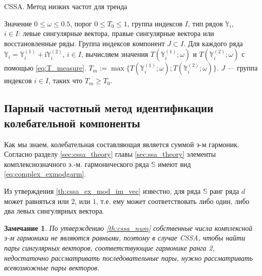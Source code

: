\documentclass[specialist,
               substylefile = spbu.rtx,
               subf,href,colorlinks=true, 12pt]{disser}
\newcommand{\I}{\mathrm{i}}
\newtheorem{remark}{Замечание}
\begin{document}
\begin{algorithm}[!hhh]
\caption{CSSA. Метод низких частот для тренда}
\label{alg:freqcssa}
\begin{algorithmic}[1]
\REQUIRE Значение  $0 \leqslant  \omega \leqslant 0.5$, порог $0 \leqslant T_0 \leqslant 1$, группа индексов $I$, тип рядов $\mathbb{Y}_i$,\\ $i \in I$: левые сингулярные вектора,
правые сингулярные вектора или восстановленные ряды.
\ENSURE Группа индексов компонент $J \subset I$.
\STATE  Для каждого ряда $\mathbb{Y}_i = \mathbb{Y}^{(1)}_i + \I \mathbb{Y}^{(2)}_i $, $i \in I$, вычисляем значения $T(\mathbb{Y}^{(1)}_i; \omega)$ и $T(\mathbb{Y}^{(2)}_i; \omega)$ с помощью \eqref{eq:T_measure}. $T_m := \max \{T(\mathbb{Y}^{(1)}_i; \omega); T(\mathbb{Y}^{(2)}_i; \omega)\}$.
\STATE $J$ --- группа индексов $i \in I$, таких что $T_m \geqslant T_0$.
\end{algorithmic}
\end{algorithm}

\subsection{Парный частотный метод идентификации колебательной компоненты}
Как мы знаем, колебательная составляющая является суммой э-м гармоник.
Согласно разделу \ref{sec:cssa_theory} главы \ref{sec:ssa_theory} элементы комплекснозначного э.-м. гармонического ряда $\mathbb{S}$ имеют вид \eqref{eq:complex_exmodgarm}.

Из утверждения \ref{th:cssa_ex_mod_im_vec} известно, для ряда $\mathbb{S}$ ранг ряда $d$ может равняться или $2$, или $1$, т.е. ему может соответствовать либо один, либо два левых сингулярных вектора. 

\begin{remark}
По утверждению \ref{th:cssa_num} собственные числа комплексной э-м гармоники не являются равными, поэтому в случае CSSA, чтобы найти пары сингулярных векторов, соответствующие гармонике ранга 2, недостаточно рассматривать последовательные пары, нужно рассматривать всевозможные пары векторов.
\end{remark}
\end{document}

